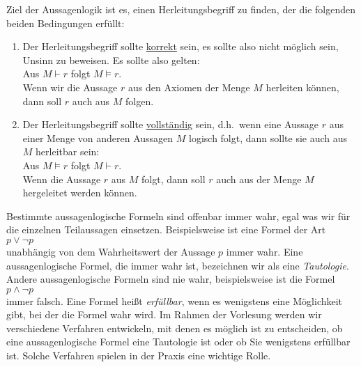 Ziel der Aussagenlogik ist es, einen
Herleitungsbegriff zu finden, der die folgenden beiden Bedingungen erf\"{u}llt:
\begin{enumerate}
\item Der Herleitungsbegriff sollte \underline{\color{red}korrekt} sein, es sollte also nicht m\"{o}glich sein,
      Unsinn zu beweisen.  Es sollte also gelten: \\[0.2cm]
      \hspace*{1.3cm} Aus $M \vdash r$ folgt $M \models r$. 
      \\[0.2cm]
      Wenn wir die Aussage $r$ aus den Axiomen der Menge $M$ herleiten k\"{o}nnen, dann 
      soll $r$ auch aus $M$ folgen.
\item Der Herleitungsbegriff sollte \underline{\color{red}vollst\"{a}ndi}{\color{red}g} sein, d.h.~wenn eine Aussage $r$
      aus einer Menge von anderen Aussagen $M$ logisch folgt, dann sollte sie
      auch aus $M$ herleitbar sein: \\[0.2cm]
      \hspace*{1.3cm} Aus $M \models r$ folgt $M \vdash r$. 
      \\[0.2cm]
      Wenn die Aussage $r$ aus $M$ folgt, dann soll $r$ auch aus der Menge $M$
      hergeleitet werden k\"{o}nnen.
\end{enumerate}

Bestimmte aussagenlogische Formeln sind offenbar immer wahr, egal was
 wir f\"{u}r die einzelnen Teilaussagen einsetzen.  Beispielsweise ist eine Formel der Art
\\[0.2cm]
\hspace*{1.3cm}
$p \vee \neg p$
\\[0.2cm]
unabh\"{a}ngig von dem Wahrheitswert der Aussage $p$ immer wahr.  Eine aussagenlogische
Formel, die immer wahr ist, bezeichnen wir als eine \emph{\color{blue}Tautologie}.  Andere
aussagenlogische Formeln sind nie wahr, beispielsweise ist die Formel
\\[0.2cm]
\hspace*{1.3cm}
$p \wedge \neg p$
\\[0.2cm]
immer falsch.  Eine Formel hei\ss{}t \emph{\color{blue}erf\"{u}llbar}, wenn es wenigstens eine M\"{o}glichkeit
gibt, bei der die Formel wahr wird.  Im Rahmen der Vorlesung werden wir verschiedene Verfahren
entwickeln, mit denen es m\"{o}glich ist zu entscheiden, ob eine aussagenlogische Formel eine
Tautologie ist oder ob Sie wenigstens erf\"{u}llbar ist.  Solche Verfahren spielen
in der Praxis eine wichtige Rolle.

